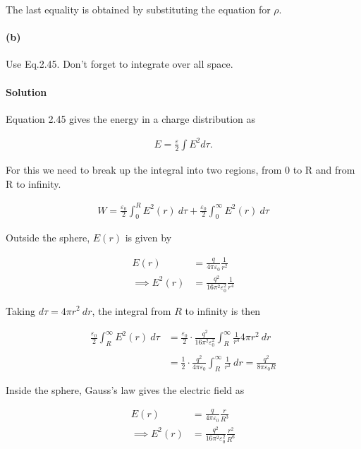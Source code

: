 \documentclass{article}
\begin{document}
The last equality is obtained by substituting the equation for $\rho$.


\paragraph{(b)} Use Eq.2.45.  Don't forget to integrate over all space.

\paragraph{Solution} Equation 2.45 gives the energy in a charge distribution as 

\begin{align*}
    E = \frac{\varepsilon}{2}\int E^2 d\tau.
\end{align*}

For this we need to break up the integral into two regions, from 0 to R and from R to infinity.

\begin{align*}
    W = \frac{\varepsilon_0}{2}\int_0^R E^2(r)\ d\tau + \frac{\varepsilon_0}{2}\int_0^{\infty} E^2(r)\ d\tau
\end{align*}

Outside the sphere, $E(r)$ is given by 

\begin{align*}
    E(r) &= \frac{q}{4\pi\varepsilon_0}\frac{1}{r^2} \\
    \implies E^2(r) &= \frac{q^2}{16\pi^2\varepsilon_0^2}\frac{1}{r^4}
\end{align*}

Taking $d\tau = 4\pi r^2\ dr$, the integral from $R$ to infinity is then 

\begin{align*}
    \frac{\varepsilon_0}{2}\int_R^{\infty} E^2(r)\ d\tau &= \frac{\varepsilon_0}{2}\cdot \frac{q^2}{16\pi^2\varepsilon_0^2}\int_R^{\infty} \frac{1}{r^4}4\pi r^2\ dr \\
    \\
    &= \frac{1}{2}\cdot \frac{q^2}{4\pi\varepsilon_0}\int_R^{\infty} \frac{1}{r^2}\ dr = \frac{q^2}{8\pi\varepsilon_0 R}
\end{align*}

Inside the sphere, Gauss's law gives the electric field as 

\begin{align*}
    E(r) &= \frac{q}{4\pi\varepsilon_0}\frac{r}{R^3} \\
    \implies E^2(r) &= \frac{q^2}{16\pi^2 \varepsilon^2_0}\frac{r^2}{R^6} 
\end{align*}
\end{document}
